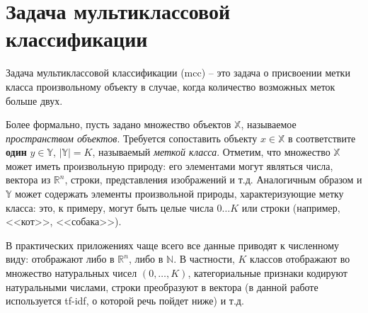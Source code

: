 
\chapter{Задача мультиклассовой классификации }
\label{chapter-1}
Задача мультиклассовой классификации (\acrlong{mcc}) -- это задача о присвоении метки класса произвольному объекту в случае, когда количество возможных меток больше двух.

Более формально, пусть задано множество объектов $\mathbb{X}$, называемое \textit{пространством объектов}.
Требуется сопоставить объекту $x \in \mathbb{X}$ в соответствите \textbf{один} $y \in \mathbb{Y}$, $|\mathbb{Y}| = K$, называемый \textit{меткой класса}.
Отметим, что множество $\mathbb{X}$ может иметь произвольную природу: его элементами могут являться числа, вектора из $\mathbb{R}^n$, строки, представления изображений и т.д.
Аналогичным образом и $\mathbb{Y}$ может содержать элементы произвольной природы, характеризующие метку класса: это, к примеру, могут быть целые числа $0 \dots K$ или строки (например, <<кот>>, <<собака>>).

В практических приложениях чаще всего все данные приводят к численному виду: отображают либо в $\mathbb{R}^n$, либо в $\mathbb{N}$.
В частности, $K$ классов отображают во множество натуральных чисел $(0, \dots, K)$, категориальные признаки кодируют натуральными числами, строки преобразуют в вектора (в данной работе используется \acrshort{tf-idf}, о которой речь пойдет ниже) и т.д.

